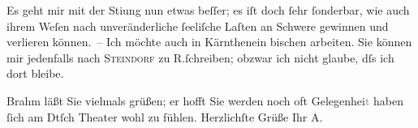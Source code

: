 \pstart
           Es geht mir mit der Sti{\geminationm}ung nun etwas beſſer; es iſt
               doch{ }ſehr{ }ſonderbar, wie auch \strikeout{\textcolor{gray}{ganz feſtſtehende}} ihrem Weſen nach unveränderliche{ }ſeeliſche Laſten an Schwere gewinnen und
               verlieren können. – Ich möchte auch in Kärnthenein bischen arbeiten. Sie können mir jedenfalls nach \textsc{Steindorf} zu R.ſchreiben; obzwar ich nicht glaube, dſs ich dort
               bleibe.\pend
           
\pstart
           Brahm läßt Sie vielmals grüßen; er hofft Sie
               werden noch oft Gelegenhei\textcolor{gray}{t} haben{ }ſich am Dtſch Theater wohl zu fühlen.\pend
           \pstart Herzlichſte Grüße Ihr \spacefill\mbox{A.}\pend{}\endnumbering{}  \newcommand{\dateiname}{L00802}\newcommand{\titel}{Arthur Schnitzler an Hugo von Hofmannsthal, [4. 6. 1898]}\newcommand{\editorInnen}{Martin Anton Müller und Gerd-Hermann Susen}
